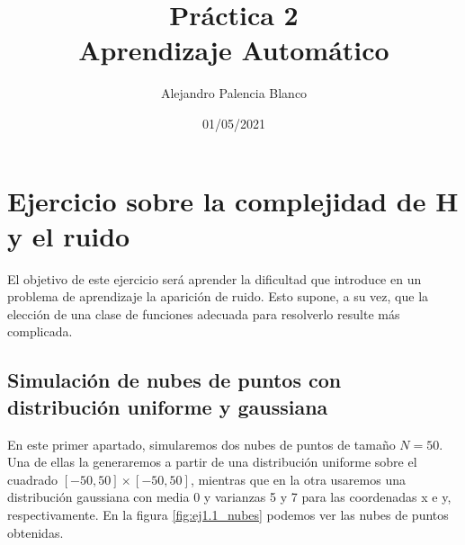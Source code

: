 \documentclass[10pt,a4paper]{article}
\title{
Práctica 2\\
\large Aprendizaje Automático \\
}
\author{
Alejandro Palencia Blanco\\
}
\date{01/05/2021}
\begin{document}
\maketitle

\newpage

\tableofcontents

\newpage

\section{Ejercicio sobre la complejidad de H y el ruido}

El objetivo de este ejercicio será aprender la dificultad que introduce en un problema de aprendizaje la aparición de ruido. Esto supone, a su vez, que la elección de una clase de funciones adecuada para resolverlo resulte más complicada.

\subsection{Simulación de nubes de puntos con distribución uniforme y gaussiana}

En este primer apartado, simularemos dos nubes de puntos de tamaño $N=50$. Una de ellas la generaremos a partir de una distribución uniforme sobre el cuadrado $[-50,50] \times [-50,50]$, mientras que en la otra usaremos una distribución gaussiana con media 0 y varianzas 5 y 7 para las coordenadas x e y, respectivamente. En la figura \ref{fig:ej1.1_nubes} podemos ver las nubes de puntos obtenidas.
\end{document}
